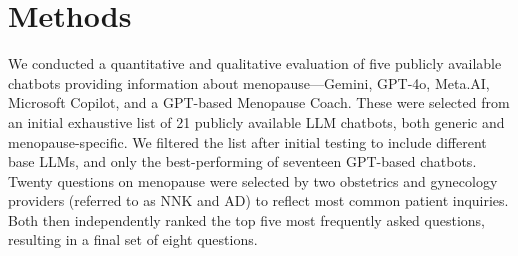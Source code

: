 \section{Methods}
We conducted a quantitative and qualitative evaluation of five publicly available chatbots providing information about menopause---Gemini, GPT-4o, Meta.AI, Microsoft Copilot, and a GPT-based Menopause Coach. These were selected from an initial exhaustive list of 21 publicly available LLM chatbots, both generic and menopause-specific. We filtered the list after initial testing to include different base LLMs, and only the best-performing of seventeen GPT-based chatbots. 
Twenty questions on menopause were selected by two obstetrics and gynecology providers (referred to as NNK and AD) to reflect most common patient inquiries. Both then independently ranked the top five most frequently asked questions, resulting in a final set of eight questions. 

